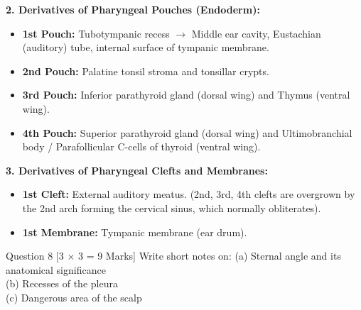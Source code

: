 \documentclass[11pt,a4paper]{article}
\begin{document}
\begin{ansbox}
\textbf{2. Derivatives of Pharyngeal Pouches (Endoderm):}
\begin{itemize}[leftmargin=*]
    \item \textbf{1st Pouch:} Tubotympanic recess $\rightarrow$ Middle ear cavity, Eustachian (auditory) tube, internal surface of tympanic membrane.
    \item \textbf{2nd Pouch:} Palatine tonsil stroma and tonsillar crypts.
    \item \textbf{3rd Pouch:} Inferior parathyroid gland (dorsal wing) and Thymus (ventral wing).
    \item \textbf{4th Pouch:} Superior parathyroid gland (dorsal wing) and Ultimobranchial body / Parafollicular C-cells of thyroid (ventral wing).
\end{itemize}

\textbf{3. Derivatives of Pharyngeal Clefts and Membranes:}
\begin{itemize}[leftmargin=*]
    \item \textbf{1st Cleft:} External auditory meatus. (2nd, 3rd, 4th clefts are overgrown by the 2nd arch forming the cervical sinus, which normally obliterates).
    \item \textbf{1st Membrane:} Tympanic membrane (ear drum).
\end{itemize}
\end{ansbox}

\begin{qbox}{Question 8 [3 $\times$ 3 = 9 Marks]}
Write short notes on:
(a) Sternal angle and its anatomical significance \\
(b) Recesses of the pleura \\
(c) Dangerous area of the scalp
\end{qbox}
\end{document}
